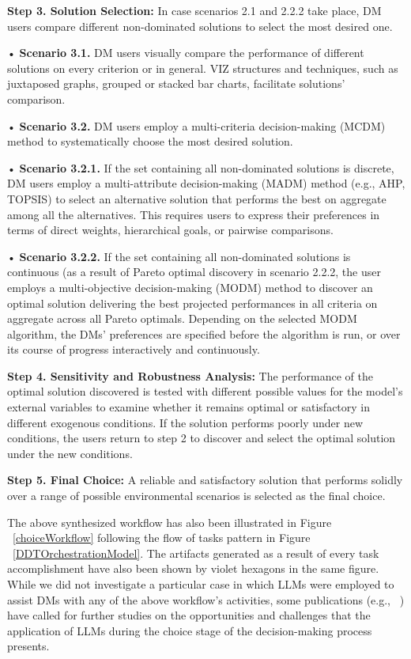 \documentclass{sfuthesis}
\begin{document}
\textbf{Step 3. Solution Selection:} In case scenarios 2.1 and 2.2.2 take place, DM users compare different non-dominated solutions to select the most desired one.\par
{
\setlength{\leftskip}{0.5cm}
\noindent•	\textbf{Scenario 3.1.} DM users visually compare the performance of different solutions on every criterion or in general. VIZ structures and techniques, such as juxtaposed graphs, grouped or stacked bar charts, facilitate solutions' comparison.\par
\noindent•	\textbf{Scenario 3.2.} DM users employ a multi-criteria decision-making (MCDM) method to systematically choose the most desired solution.\par
}
{
\setlength{\leftskip}{1cm}
\noindent•	\textbf{Scenario 3.2.1.} If the set containing all non-dominated solutions is discrete, DM users employ a multi-attribute decision-making (MADM) method (e.g., AHP, TOPSIS) to select an alternative solution that performs the best on aggregate among all the alternatives. This requires users to express their preferences in terms of direct weights, hierarchical goals, or pairwise comparisons.\par
\noindent•	\textbf{Scenario 3.2.2.} If the set containing all non-dominated solutions is continuous (as a result of Pareto optimal discovery in scenario 2.2.2, the user employs a multi-objective decision-making (MODM) method to discover an optimal solution delivering the best projected performances in all criteria on aggregate across all Pareto optimals. Depending on the selected MODM algorithm, the DMs' preferences are specified before the algorithm is run, or over its course of progress interactively and continuously.\par
}
\textbf{Step 4. Sensitivity and Robustness Analysis:} The performance of the optimal solution discovered is tested with different possible values for the model's external variables to examine whether it remains optimal or satisfactory in different exogenous conditions. If the solution performs poorly under new conditions, the users return to step 2 to discover and select the optimal solution under the new conditions. \par
\textbf{Step 5. Final Choice:} A reliable and satisfactory solution that performs solidly over a range of possible environmental scenarios is selected as the final choice.\par
The above synthesized workflow has also been illustrated in Figure ~\ref{choiceWorkflow} following the flow of tasks pattern in Figure ~\ref{DDTOrchestrationModel}. The artifacts generated as a result of every task accomplishment have also been shown by violet hexagons in the same figure. While we did not investigate a particular case in which LLMs were employed to assist DMs with any of the above workflow's activities, some publications (e.g., ~\cite{handler_large_2024}) have called for further studies on the opportunities and challenges that the application of LLMs during the choice stage of the decision-making process presents.\par
\end{document}
